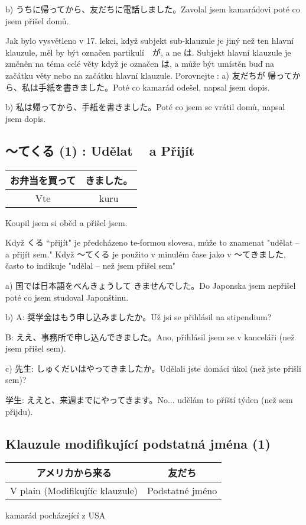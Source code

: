 b) うちに帰ってから、友だちに電話しました。Zavolal jsem kamarádovi poté co jsem přišel domů.


Jak bylo vysvětleno v 17. lekci, když subjekt sub-klauzule je jiný než ten hlavní klauzule, měl by být označen partikulí　が, a ne は. Subjekt hlavní klauzule je změněn na téma celé věty když je označen  は, a může být umístěn buď na začátku věty nebo na začátku hlavní klauzule.
Porovnejte :
a) 友だちが 帰ってから、私は手紙を書きました。Poté co kamarád odešel, napsal jsem dopis.

b) 私は帰ってから、手紙を書きました。Poté co jsem se vrátil domů, napsal jsem dopis.

\subsection{ 〜てくる (1) : Udělat ~ a Přijít}
\begin{center}
\begin{tabular}{|c|c|}
\hline
お弁当を買って&きました。\\
\hline
Vte&kuru\\
\hline
\end{tabular}
\end{center}
Koupil jsem si oběd a přišel jsem.


Když くる “přijít"  je předcházeno te-formou slovesa, může to znamenat "udělat -- a přijít sem." Když 〜てくる je použito v minulém čase jako v 〜てきました, často to indikuje "udělal -- než jsem přišel sem"


a) 国では日本語をべんきょうして きませんでした。Do Japonska jsem nepřišel poté co jsem studoval Japonštinu.

b) 
A: 奨学金はもう申し込みましたか。Už jsi se přihlásil na stipendium?

B: ええ、事務所で申し込んできました。Ano, přihlásil jsem se v kanceláři (než jsem přišel sem).

c) 
先生: しゅくだいはやってきましたか。Udělali jste domácí úkol (než jste přišli sem)?

学生: ええと、来週までにやってきます。No... udělám to příští týden (než sem přijdu).

\subsection{ Klauzule modifikující podstatná jména (1)}
\begin{center}
\begin{tabular}{|c|c|}
アメリカから来る&友だち\\
\hline
V plain (Modifikujííc klauzule)&Podstatné jméno\\
\hline
\end{tabular}
\end{center}
kamarád pocházející z USA

